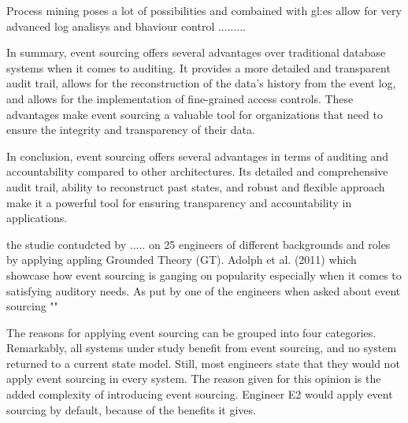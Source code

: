 Process mining poses a lot of possibilities and combained with \gls{gl:es} allow for very advanced log analisys and bhaviour control .........

In summary, event sourcing offers several advantages over traditional database systems when it comes to auditing. It provides a more detailed and transparent audit trail, allows for the reconstruction of the data's history from the event log, and allows for the implementation of fine-grained access controls. These advantages make event sourcing a valuable tool for organizations that need to ensure the integrity and transparency of their data.

In conclusion, event sourcing offers several advantages in terms of auditing and accountability compared to other architectures. Its detailed and comprehensive audit trail, ability to reconstruct past states, and robust and flexible approach make it a powerful tool for ensuring transparency and accountability in applications.

the studie contudcted by ..... on 25 engineers of different backgrounds and roles by applying appling Grounded Theory (GT). Adolph et al. (2011) which showcase how event sourcing is ganging on popularity especially when it comes to satisfying auditory needs. As put by one of the engineers when asked about event sourcing ""

The reasons for applying event sourcing can be grouped into four categories. Remarkably, all systems under study benefit from event sourcing, and no system returned to a current state model. Still, most engineers state that they would not apply event sourcing in every system. The reason given for this opinion is the added complexity of introducing event sourcing. Engineer E2 would apply event sourcing by default, because of the benefits it gives.~\citep{OVEREEM2021110970}
